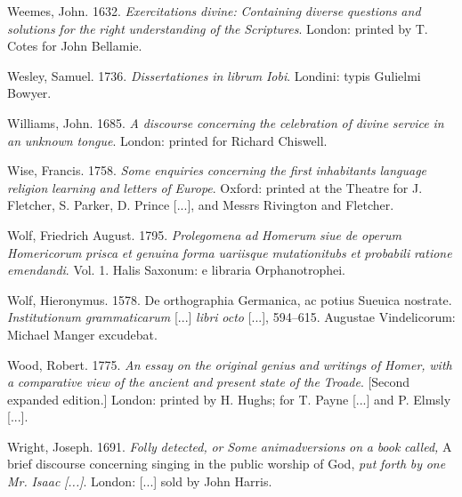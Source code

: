 Weemes, John. 1632. \textit{Exercitations} \textit{divine:} \textit{Containing} \textit{diverse} \textit{questions} \textit{and} \textit{solutions} \textit{for} \textit{the} \textit{right} \textit{understanding} \textit{of} \textit{the} \textit{Scriptures}. London: printed by T. Cotes for John Bellamie.

Wesley, Samuel. 1736. \textit{Dissertationes} \textit{in} \textit{librum} \textit{Iobi}. Londini: typis Gulielmi Bowyer.

Williams, John. 1685. \textit{A} \textit{discourse} \textit{concerning} \textit{the} \textit{celebration} \textit{of} \textit{divine} \textit{service} \textit{in} \textit{an} \textit{unknown} \textit{tongue}. London: printed for Richard Chiswell.

Wise, Francis. 1758. \textit{Some} \textit{enquiries} \textit{concerning} \textit{the} \textit{first} \textit{inhabitants} \textit{language} \textit{religion} \textit{learning} \textit{and} \textit{letters} \textit{of} \textit{Europe}. Oxford: printed at the Theatre for J. Fletcher, S. Parker, D. Prince [...], and Messrs Rivington and Fletcher.

Wolf, Friedrich August. 1795. \textit{Prolegomena} \textit{ad} \textit{Homerum} \textit{siue} \textit{de} \textit{operum} \textit{Homericorum} \textit{prisca} \textit{et} \textit{genuina} \textit{forma} \textit{uariisque} \textit{mutationitubs} \textit{et} \textit{probabili} \textit{ratione} \textit{emendandi}. Vol. 1. Halis Saxonum: e libraria Orphanotrophei.

Wolf, Hieronymus. 1578. De orthographia Germanica, ac potius Sueuica nostrate. \textit{Institutionum} \textit{grammaticarum} [...] \textit{libri} \textit{octo} [...], 594–615. Augustae Vindelicorum: Michael Manger excudebat.

Wood, Robert. 1775. \textit{An} \textit{essay} \textit{on} \textit{the} \textit{original} \textit{genius} \textit{and} \textit{writings} \textit{of} \textit{Homer,} \textit{with} \textit{a} \textit{comparative} \textit{view} \textit{of} \textit{the} \textit{ancient} \textit{and} \textit{present} \textit{state} \textit{of} \textit{the} \textit{Troade}. [Second expanded edition.] London: printed by H. Hughs; for T. Payne [...] and P. Elmsly [...].

Wright, Joseph. 1691. \textit{Folly} \textit{detected,} \textit{or} \textit{Some} \textit{animadversions} \textit{on} \textit{a} \textit{book} \textit{called,} A brief discourse concerning singing in the public worship of God, \textit{put} \textit{forth} \textit{by} \textit{one} \textit{Mr.} \textit{Isaac} \textit{\citealt{Marlow1690} [...]}. London: [...] sold by John Harris.

